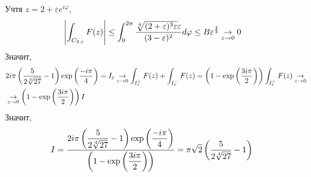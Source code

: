 Учтя $z = 2 + \varepsilon e^{i \varphi}$,
\begin{align*}
  & \left|  \int_{C_{2, \varepsilon}}F(z) \right| \leq \int_{0}^{2 \pi}\frac{\sqrt[4]{(2+\varepsilon)^3\varepsilon}\varepsilon}{(3-\varepsilon)^2}d\varphi \leq B\varepsilon^{\frac{4}{3}} \underset{\varepsilon \to 0}{\to} 0
\end{align*}
Значит,
\begin{align*}
  & 2 i \pi \left( \frac{5}{2\sqrt[4]{27}} - 1 \right)\exp\left( \frac{-i\pi}{4} \right) = I_\varepsilon \underset{\varepsilon \to 0}{\to} \int_{I_\varepsilon^+}F(z) + \int_{I_\varepsilon^-}F(z) = \left( 1 -\exp\left( \frac{3i\pi}{2}\right) \right) \int_{I_\varepsilon^+}F(z) \underset{\varepsilon \to 0}{\to} \\
  & \underset{\varepsilon \to 0}{\to} \left( 1 -\exp\left( \frac{3i\pi}{2}\right) \right) I
\end{align*}
Значит,
\begin{align*}
  & I = \frac{2 i \pi \left( \displaystyle \frac{5}{2\sqrt[4]{27}} - 1 \right)\exp\left( \displaystyle\frac{-i\pi}{4} \right)}{\left( 1 -\exp\left( \displaystyle \frac{3i\pi}{2}\right) \right)}= \pi \sqrt{2}\left( \displaystyle \frac{5}{2\sqrt[4]{27}} - 1 \right)
\end{align*}

